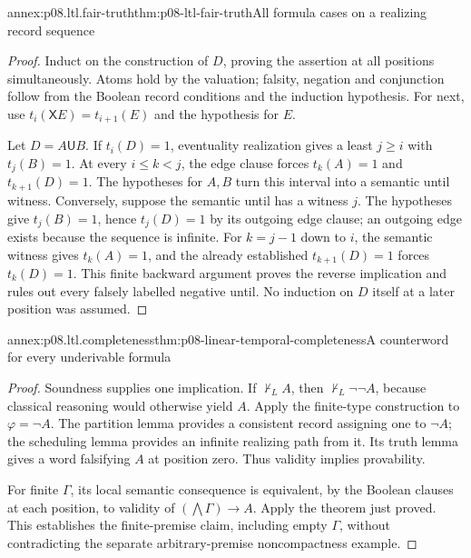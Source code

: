 \begin{annexitem}{annex:p08.ltl.fair-truth}{thm:p08-ltl-fair-truth}{All formula cases on a realizing record sequence}
\begin{proof}
Induct on the construction of \(D\), proving the assertion at
all positions simultaneously. Atoms hold by the valuation;
falsity, negation and conjunction follow from the Boolean record
conditions and the induction hypothesis. For next, use
\(t_i(\mathsf XE)=t_{i+1}(E)\) and the hypothesis for \(E\).

Let \(D=A\mathbin{\mathsf U}B\). If \(t_i(D)=1\),
eventuality realization gives a least \(j\geq i\) with
\(t_j(B)=1\). At every \(i\leq k<j\), the edge clause
forces \(t_k(A)=1\) and \(t_{k+1}(D)=1\). The hypotheses
for \(A,B\) turn this interval into a semantic until witness.
Conversely, suppose the semantic until has a witness \(j\).
The hypotheses give \(t_j(B)=1\), hence \(t_j(D)=1\) by
its outgoing edge clause; an outgoing edge exists because the
sequence is infinite. For \(k=j-1\) down to \(i\), the
semantic witness gives \(t_k(A)=1\), and the already established
\(t_{k+1}(D)=1\) forces \(t_k(D)=1\). This finite backward
argument proves the reverse implication and rules out every
falsely labelled negative until. No induction on \(D\) itself
at a later position was assumed.
\end{proof}
\end{annexitem}

\begin{annexitem}{annex:p08.ltl.completeness}{thm:p08-linear-temporal-completeness}{A counterword for every underivable formula}
\begin{proof}
Soundness supplies one implication. If \(\nvdash_L A\), then
\(\nvdash_L\neg\neg A\), because classical reasoning would
otherwise yield \(A\). Apply the finite-type construction to
\(\varphi=\neg A\). The partition lemma provides a consistent
record assigning one to \(\neg A\); the scheduling lemma provides
an infinite realizing path from it. Its truth lemma gives a word
falsifying \(A\) at position zero. Thus validity implies provability.

For finite \(\Gamma\), its local semantic consequence is
equivalent, by the Boolean clauses at each position, to validity
of \((\bigwedge\Gamma)\to A\). Apply the theorem just proved.
This establishes the finite-premise claim, including empty
\(\Gamma\), without contradicting the separate arbitrary-premise
noncompactness example.
\end{proof}
\end{annexitem}

